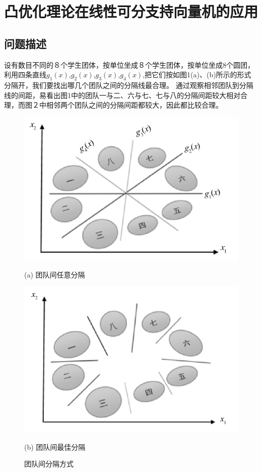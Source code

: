\documentclass[12pt,a4paper]{article}%
\begin{document}
	\thispagestyle{empty}       %
	\newpage%
	\setcounter{page}{1}        %

	
	
	\section{凸优化理论在线性可分支持向量机的应用}
	\subsection{问题描述}
	设有数目不同的８个学生团体，按单位坐成８个学生团体，按单位坐成8个圆团，利用四条直线$g_1(x)$,$g_2(x)$,$g_3(x)$,$g_4(x)$,把它们按如图1(a)、(b)所示的形式分隔开，我们要找出哪几个团队之间的分隔线最合理。
	通过观察相邻团队到分隔线的间距，易看出图1中的团队一与二、六与七、七与八的分隔间距较大相对合理，而图２中相邻两个团队之间的分隔间距都较大，因此都比较合理。
	\begin{figure}[htbp]
		\begin{minipage}[t]{0.5\linewidth}
			\centering
			\includegraphics[width=\textwidth]{figure1}
			\centerline{\fontsize{10pt}{15pt}(a) 团队间任意分隔}
		\end{minipage}%
		\begin{minipage}[t]{0.5\linewidth}
			\centering
			\includegraphics[width=\textwidth]{figure2}
			\centerline{\fontsize{10pt}{15pt}(b) 团队间最佳分隔}
		\end{minipage}
		\caption{\fontsize{10pt}{15pt}团队间分隔方式}
	\end{figure}
	
\end{document}
